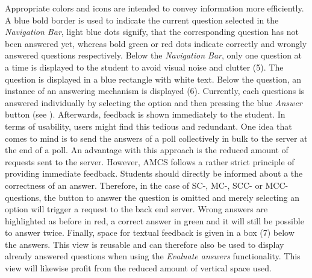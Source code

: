 Appropriate colors and icons are intended to convey information more efficiently. A blue bold border is used to indicate the current question selected in the \emph{Navigation Bar}, light blue dots signify, that the corresponding question has not been answered yet, whereas bold green or red dots indicate correctly and wrongly answered questions respectively. 
\newline
\newline
Below the \emph{Navigation Bar}, only one question at a time is displayed to the student to avoid visual noise and clutter (5). The question is displayed in a blue rectangle with white text. Below the question, an instance of an answering mechanism is displayed (6). 
Currently, each questions is answered individually by selecting the option and then pressing the blue \emph{Answer} button (see ). Afterwards, feedback is shown immediately to the student. In terms of usability, users might find this tedious and redundant. One idea that comes to mind is to send the answers of a poll collectively in bulk to the server at the end of a poll. An advantage with this approach is the reduced amount of requests sent to the server. However, AMCS follows a rather strict principle of providing immediate feedback. Students should directly be informed about a the correctness of an answer.
Therefore, in the case of SC-, MC-, SCC- or MCC-questions, the button to answer the question is omitted and merely selecting an option will trigger a request to the back end server.
Wrong answers are highlighted as before in red, a correct answer in green and it will still be possible to answer twice. Finally, space for textual feedback is given in a box (7) below the answers. This view is reusable and can therefore also be used to display already answered questions when using the \emph{Evaluate answers} functionality. This view will likewise profit from the reduced amount of vertical space used. 

